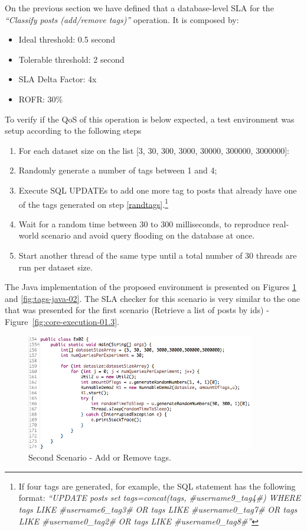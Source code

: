 On the previous section we have defined that a database-level SLA for the \textit{``Classify posts (add/remove tags)''} operation. It is composed by: 

\begin{itemize}
	\item{Ideal threshold: 0.5 second}
	\item{Tolerable threshold: 2 second}
	\item{SLA Delta Factor: 4x}
	\item{ROFR: 30\%}
\end{itemize}

To verify if the QoS of this operation is below expected, a test environment was setup according to the following steps

\begin{enumerate}
\item{For each dataset size on the list [3, 30, 300, 3000, 30000, 300000, 3000000]:}
\item{Randomly generate a number of tags between 1 and 4; \label{randtags}}
\item{Execute SQL UPDATEs to add one more tag to posts that already have one of the tags generated on step \ref{randtags}.\footnote{If four tags are generated, for example, the SQL statement has the following format: \textit{``UPDATE posts set tags=concat(tags, \#username9\_tag4\#) WHERE tags LIKE \#username6\_tag3\# OR tags LIKE \#username0\_tag7\# OR tags LIKE \#username0\_tag2\# OR tags LIKE \#username0\_tag8\#''}}}
\item{Wait for a random time between 30 to 300 milliseconds, to reproduce real-world scenario and avoid	query flooding on the database at once.}
\item{Start another thread of the same type until a total number of 30 threads are run per dataset size.}
\end{enumerate}

The Java implementation of the proposed environment is presented on Figures \ref{fig:tags-java-01} and \ref{fig:tags-java-02}. The SLA checker for this scenario is very similar to the one that was presented for the first scenario (Retrieve a list of posts by ids) - Figure~\ref{fig:core-execution-01.3}.


\begin{figure}[ht!]
\centering
\includegraphics[width=100mm]{Imagens/tags-java-01.png}
\caption{Second Scenario - Add or Remove tags.\label{fig:tags-java-01}}
\end{figure}

